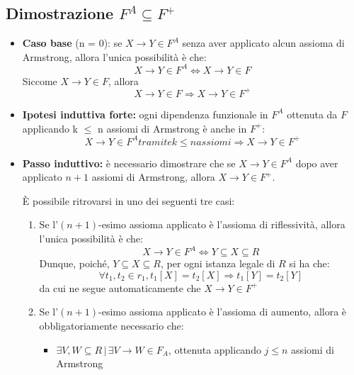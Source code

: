 \documentclass{article}
\begin{document}
\subsection{Dimostrazione $F^{A} \subseteq F^{+}$}
\begin{itemize}
  \item \textbf{Caso base} (n = 0): se $X \rightarrow Y \in F^{A}$ senza aver applicato alcun assioma di Armstrong, allora l'unica possibilità è che:
  \begin{equation}
    X \rightarrow Y \in F^{A} \Leftrightarrow X \rightarrow Y \in F
  \end{equation}
  Siccome $X \rightarrow Y \in F$, allora 
  \begin{equation}
    X \rightarrow Y \in F \Rightarrow X \rightarrow Y \in F^{+}
  \end{equation} 
  \item \textbf{Ipotesi induttiva forte:} ogni dipendenza funzionale in $F^{A}$ ottenuta da $F$
  applicando k $\leq$ n assiomi di Armstrong è anche in $F^{+}$:
  \begin{equation}
    X \rightarrow Y \in F^{A} tramite k \leq n assiomi \Rightarrow X \rightarrow Y \in F^{+}
  \end{equation}
  \item \textbf{Passo induttivo:} è necessario dimostrare che se $X \rightarrow Y \in F^{A}$ dopo aver applicato $n +1$ assiomi di Armstrong, allora $ X \rightarrow Y \in F^{+}$.\par
  È possibile ritrovarsi in uno dei seguenti tre casi:
  \begin{enumerate}
    \item Se l'$(n + 1)$-esimo assioma applicato è l'assioma di riflessività, allora l'unica possibilità è che:
    \begin{equation}
      X \rightarrow Y \in F^{A} \Leftrightarrow Y \subseteq X \subseteq R
    \end{equation}
    Dunque, poiché, $Y \subseteq X \subseteq R$, per ogni istanza legale di $R$ si ha che:
    \begin{equation}
      \forall t_1, t_2 \in r_{1}, t_1[X] = t_2[X] \Rightarrow t_1[Y] = t_2[Y]
    \end{equation}
    da cui ne segue automaticamente che $X \rightarrow Y \in F^{+}$
    \item Se l'$(n + 1)$-esimo assioma applicato è l'assioma di aumento, allora è obbligatoriamente necessario che:
    \begin{itemize}
      \item $\exists V, W \subseteq R \, | \, \exists V \rightarrow W \in F_{A}$, ottenuta applicando $j \leq n$ assiomi di Armstrong\\


\end{itemize}
\end{enumerate}
\end{itemize}
\end{document}
